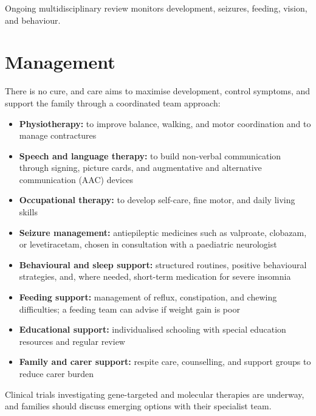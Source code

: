 Ongoing multidisciplinary review monitors development, seizures, feeding, vision, and behaviour.

\section*{Management}
There is no cure, and care aims to maximise development, control symptoms, and support the family through a coordinated team approach:

\begin{itemize}
    \item \textbf{Physiotherapy:} to improve balance, walking, and motor coordination and to manage contractures
    \item \textbf{Speech and language therapy:} to build non-verbal communication through signing, picture cards, and augmentative and alternative communication (AAC) devices
    \item \textbf{Occupational therapy:} to develop self-care, fine motor, and daily living skills
    \item \textbf{Seizure management:} antiepileptic medicines such as valproate, clobazam, or levetiracetam, chosen in consultation with a paediatric neurologist
    \item \textbf{Behavioural and sleep support:} structured routines, positive behavioural strategies, and, where needed, short-term medication for severe insomnia
    \item \textbf{Feeding support:} management of reflux, constipation, and chewing difficulties; a feeding team can advise if weight gain is poor
    \item \textbf{Educational support:} individualised schooling with special education resources and regular review
    \item \textbf{Family and carer support:} respite care, counselling, and support groups to reduce carer burden
\end{itemize}

Clinical trials investigating gene-targeted and molecular therapies are underway, and families should discuss emerging options with their specialist team.

